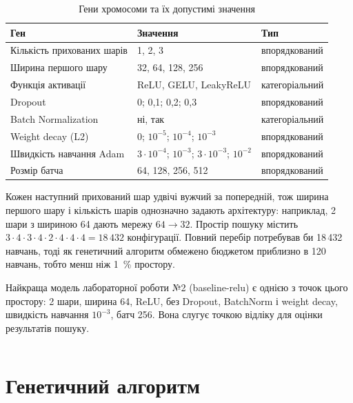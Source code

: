 \documentclass[14pt,a4paper]{extreport}
\begin{document}
\begin{table}[H]
\caption{Гени хромосоми та їх допустимі значення}
\label{tab:space}
\begin{tabularx}{\linewidth}{|l|X|l|}
\hline
\textbf{Ген} & \textbf{Значення} & \textbf{Тип} \\
\hline
Кількість прихованих шарів & 1, 2, 3 & впорядкований \\
\hline
Ширина першого шару & 32, 64, 128, 256 & впорядкований \\
\hline
Функція активації & ReLU, GELU, LeakyReLU & категоріальний \\
\hline
Dropout & 0; 0,1; 0,2; 0,3 & впорядкований \\
\hline
Batch Normalization & ні, так & категоріальний \\
\hline
Weight decay (L2) & 0; $10^{-5}$; $10^{-4}$; $10^{-3}$ & впорядкований \\
\hline
Швидкість навчання Adam & $3 \cdot 10^{-4}$; $10^{-3}$; $3 \cdot 10^{-3}$; $10^{-2}$ & впорядкований \\
\hline
Розмір батча & 64, 128, 256, 512 & впорядкований \\
\hline
\end{tabularx}
\end{table}

Кожен наступний прихований шар удвічі вужчий за попередній, тож ширина першого шару і кількість шарів однозначно задають архітектуру: наприклад, 2 шари з шириною 64 дають мережу $64 \to 32$. Простір пошуку містить $3 \cdot 4 \cdot 3 \cdot 4 \cdot 2 \cdot 4 \cdot 4 \cdot 4 = 18\,432$ конфігурації. Повний перебір потребував би 18\,432 навчань, тоді як генетичний алгоритм обмежено бюджетом приблизно в 120 навчань, тобто менш ніж 1~\% простору.

Найкраща модель лабораторної роботи №2 (baseline-relu) є однією з точок цього простору: 2 шари, ширина 64, ReLU, без Dropout, BatchNorm і weight decay, швидкість навчання $10^{-3}$, батч 256. Вона слугує точкою відліку для оцінки результатів пошуку.

\begin{listing}[H]
\inputminted[firstline=56,lastline=66]{python}{../src/aiit/run_lab3.py}
\caption{Простір пошуку (\texttt{src/aiit/run\_lab3.py})}
\label{lst:space}
\end{listing}

\section{Генетичний алгоритм}
\end{document}
